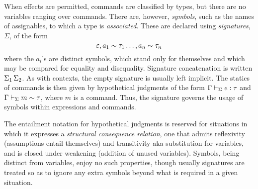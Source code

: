 \documentclass[11pt]{article}
\begin{document}
When effects are permitted, commands are classified by types, but there are no variables ranging over commands.  There are, however, \emph{symbols}, such as the names of assignables, to which a type is \emph{associated}.  These are declared using \emph{signatures}, $\Sigma$, of the form
\[
    \extSig{\extSig{\empSig}{\hasTp{a_1}{\tau_1}}\dots}{\hasTp{a_n}{\tau_n}}
\]
where the $a_i$'s are distinct symbols, which stand only for themselves and which may be compared for equality and disequality.  Signature concatenation is written $\Sigma_1\,\Sigma_2$.  As with contexts, the empty signature is usually left implicit.  The statics of commands is then given by hypothetical judgments of the form $\Gamma\entails[\Sigma] \isOf{e}{\tau}$ and $\Gamma\entails[\Sigma] \hasTp{m}{\tau}$, where $m$ is a command.  Thus, the signature governs the usage of symbols within expressions and commands.

\smallskip

The entailment notation for hypothetical judgments is reserved for situations in which it expresses a \emph{structural consequence relation}, one that admits reflexivity (assumptions entail themselves) and transitivity aka substitution for variables, and is closed under weakening (addition of unused variables).  Symbols, being distinct from variables, enjoy no such properties, though usually signatures are treated so as to ignore any extra symbols beyond what is required in a given situation.
\end{document}
